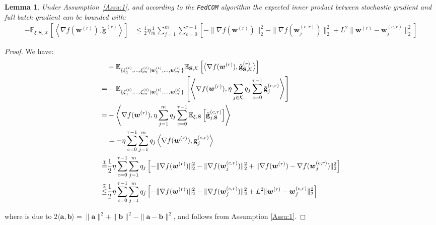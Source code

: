 \documentclass[twoside]{article}
\newtheorem{lemma}{Lemma}
\begin{document}

\begin{lemma}\label{lemma:cross-inner-bound-unbiased}
  Under Assumption~\ref{Assu:1}, and according to the \texttt{FedCOM} algorithm the expected inner product between stochastic gradient and full batch gradient can be bounded with:
\begin{align}
    - \mathbb{E}_{\xi,\mathbf{S},\mathcal{K}}\left[\left\langle\nabla f({\boldsymbol{w}}^{(r)}),{{\tilde{\mathbf{g}}}^{(r)}}\right\rangle\right]&\leq \frac{1}{2}\eta\frac{1}{m}\sum_{j=1}^m\sum_{c=0}^{\tau-1}\left[-\|\nabla f({\boldsymbol{w}}^{(r)})\|_2^2-\|\nabla{f}(\boldsymbol{w}_j^{(c,r)})\|_2^2+L^2\|{\boldsymbol{w}}^{(r)}-\boldsymbol{w}_j^{(c,r)}\|_2^2\right]\label{eq:lemma3-thm2}
\end{align}

\end{lemma}
\begin{proof}
We have:
\begin{align}
    &-\mathbb{E}_{\{{\xi}^{(t)}_{1}, \ldots, {\xi}^{(t)}_{m}|{\boldsymbol{w}}^{(t)}_{1},\ldots,  {\boldsymbol{w}}^{(t)}_{m}\}} \mathbb{E}_{\mathbf{S},\mathcal{K}}\left[ \big\langle\nabla f({\boldsymbol{w}}^{(r)}),\tilde{\mathbf{g}}_{\mathbf{S},\mathcal{K}}^{(r)}\big\rangle\right]\nonumber\\
    =&-\mathbb{E}_{\{{\xi}^{(t)}_{1}, \ldots, {\xi}^{(t)}_{m}|{\boldsymbol{w}}^{(t)}_{1},\ldots,  {\boldsymbol{w}}^{(t)}_{m}\}}\left[\left\langle \nabla f({\boldsymbol{w}}^{(r)}),\eta\sum_{j\in\mathcal{K}}q_j\sum_{c=0}^{\tau-1}\tilde{\mathbf{g}}_j^{(c,r)}\right\rangle\right]\nonumber\\
    =&-\left\langle \nabla f({\boldsymbol{w}}^{(r)}),\eta\sum_{j=1}^mq_j\sum_{c=0}^{\tau-1}\mathbb{E}_{\xi,\mathbf{S}}\left[\tilde{\mathbf{g}}_{j,\mathbf{S}}^{(c,r)}\right]\right\rangle\nonumber\\
        &=-\eta\sum_{c=0}^{\tau-1}\sum_{j=1}^mq_j\left\langle \nabla f({\boldsymbol{w}}^{(r)}),{\mathbf{g}}_j^{(c,r)}\right\rangle\nonumber\\ 
     \stackrel{\text{\ding{192}}}{=}&\frac{1}{2}\eta\sum_{c=0}^{\tau-1}\sum_{j=1}^mq_j\left[-\|\nabla f({\boldsymbol{w}}^{(r)})\|_2^2-\|{{\nabla{f}}}(\boldsymbol{w}_j^{(c,r)})\|_2^2+\|\nabla f({\boldsymbol{w}}^{(r)})-\nabla{f}(\boldsymbol{w}_j^{(c,r)})\|_2^2\right]\nonumber\\
    \stackrel{\text{\ding{193}}}{\leq}&\frac{1}{2}\eta\sum_{c=0}^{\tau-1}\sum_{j=1}^mq_j\left[-\|\nabla f({\boldsymbol{w}}^{(r)})\|_2^2-\|\nabla{f}(\boldsymbol{w}_j^{(c,r)})\|_2^2+L^2\|{\boldsymbol{w}}^{(r)}-\boldsymbol{w}_j^{(c,r)}\|_2^2\right]
   \label{eq:bounding-cross-no-redundancy}
\end{align}

where  is due to $2\langle \mathbf{a},\mathbf{b}\rangle=\|\mathbf{a}\|^2+\|\mathbf{b}\|^2-\|\mathbf{a}-\mathbf{b}\|^2$, and  follows from Assumption \ref{Assu:1}.
\end{proof}
\end{document}

